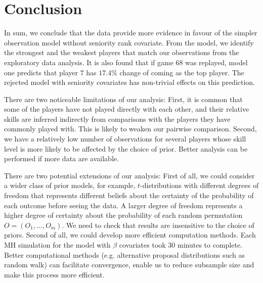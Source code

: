 \section{Conclusion}
In sum, we conclude that the data provide more evidence in favour of the simpler observation model without seniority rank covariate. From the model, we identify the strongest and the weakest players that match our observations from the exploratory data analysis. It is also found that if game $68$ was replayed, model one predicts that player $7$ has $17.4\%$ change of coming as the top player. The rejected model with seniority covariates has non-trivial effects on this prediction.

There are two noticeable limitations of our analysis: First, it is common that some of the players have not played directly with each other, and their relative skills are inferred indirectly from comparisons with the players they have commonly played with. This is likely to weaken our pairwise comparison. Second, we have a relatively low number of observations for several players whose skill level is more likely to be affected by the choice of prior. Better analysis can be performed if more data are available.

There are two potential extensions of our analysis: First of all, we could consider a wider class of prior models, for example, $t$-distributions with different degrees of freedom that represents different beliefs about the certainty of the probability of each outcome before seeing the data. A larger degree of freedom represents a higher degree of certainty about the probability of each random permutation $O=\left(O_{1}, \ldots, O_{m}\right)$. We need to check that results are insensitive to the choice of priors. Second of all, we could develop more efficient computation methods. Each MH simulation for the model with $\beta$ covariates took $30$ minutes to complete. Better computational methods (e.g. alternative proposal distributions such as random walk) can facilitate convergence, enable us to reduce subsample size and make this process more efficient.

